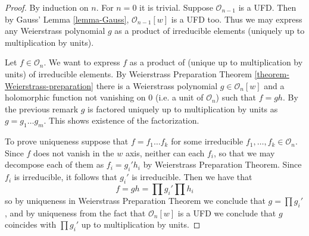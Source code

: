 \begin{proof}
By induction on $n$. For $n=0$ it is trivial. Suppose $\mathcal{O}_{n-1}$ is a
UFD. Then by Gauss' Lemma \ref{lemma-Gauss}, $\mathcal{O}_{n-1}[w]$ is a UFD
too. Thus we may express any Weierstrass polynomial $g$ as a product of
irreducible elements (uniquely up to multiplication by units).

Let $f\in \mathcal{O}_n$. We want to express $f$ as a product of (unique up to
multiplication by units) of irreducible elements. By Weierstrass Preparation
Theorem \ref{theorem-Weierstrass-preparation} there is a Weierstrass polynomial
$g\in\mathcal{O}_n[w]$ and a holomorphic function not vanishing on $0$ (i.e. a
unit of $\mathcal{O}_n$) such that $f=gh$. By the previous remark $g$ is
factored uniquely up to multiplication by units as $g=g_1\ldots g_m$. This shows
existence of the factorization.

To prove uniqueness suppose that $f=f_1\ldots f_k$ for some irreducible
$f_1,\ldots,f_k\in\mathcal{O}_n$. Since $f$ does not vanish in the $w$ axis,
neither can each $f_i$, so that we may decompose each of them as  $f_i=g_i'h_i$
by Weierstrass Preparation Theorem. Since $f_i$ is irreducible, it follows that
$g_i'$ is irreducible. Then we have that $$ f=gh=\prod g_i'\prod h_i $$ so by
uniqueness in Weierstrass Preparation Theorem we conclude that $g=\prod g_i'$,
and by uniqueness from the fact that  $\mathcal{O}_n[w]$ is a UFD we conclude
that $g$ coincides with $\prod g_i'$ up to multiplication by units.
\end{proof}





